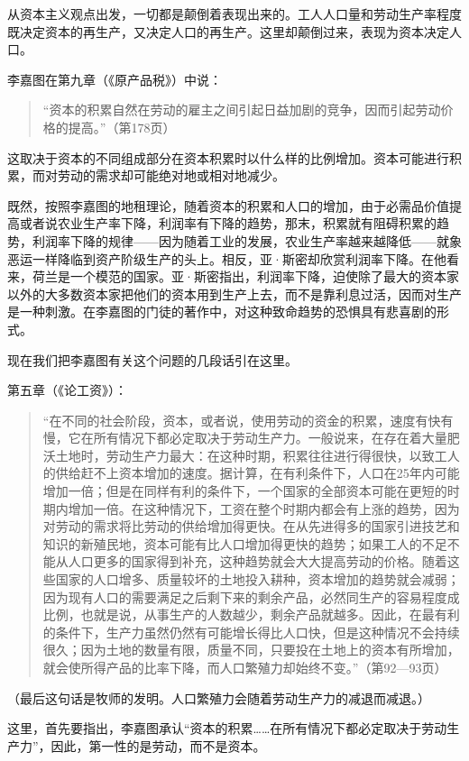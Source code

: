 从资本主义观点出发，一切都是颠倒着表现出来的。工人人口量和劳动生产率程度既决定资本的再生产，又决定人口的再生产。这里却颠倒过来，表现为资本决定人口。

李嘉图在第九章（《原产品税》）中说：

\begin{quote}{“资本的积累自然在劳动的雇主之间引起日益加剧的竞争，因而引起劳动价格的提高。”（第178页）}\end{quote}

这取决于资本的不同组成部分在资本积累时以什么样的比例增加。资本可能进行积累，而对劳动的需求却可能绝对地或相对地减少。

既然，按照李嘉图的地租理论，随着资本的积累和人口的增加，由于必需品价值提高或者说农业生产率下降，利润率有下降的趋势，那末，积累就有阻碍积累的趋势，利润率下降的规律——因为随着工业的发展，农业生产率越来越降低——就象恶运一样降临到资产阶级生产的头上。相反，亚·斯密却欣赏利润率下降。在他看来，荷兰是一个模范的国家。亚·斯密指出，利润率下降，迫使除了最大的资本家以外的大多数资本家把他们的资本用到生产上去，而不是靠利息过活，因而对生产是一种刺激。在李嘉图的门徒的著作中，对这种致命趋势的恐惧具有悲喜剧的形式。

现在我们把李嘉图有关这个问题的几段话引在这里。

第五章（《论工资》）：

\begin{quote}{“在不同的社会阶段，资本，或者说，使用劳动的资金的积累，速度有快有慢，它在所有情况下都必定取决于劳动生产力。一般说来，在存在着大量肥沃土地时，劳动生产力最大：在这种时期，积累往往进行得很快，以致工人的供给赶不上资本增加的速度。据计算，在有利条件下，人口在25年内可能增加一倍；但是在同样有利的条件下，一个国家的全部资本可能在更短的时期内增加一倍。在这种情况下，工资在整个时期内都会有上涨的趋势，因为对劳动的需求将比劳动的供给增加得更快。在从先进得多的国家引进技艺和知识的新殖民地，资本可能有比人口增加得更快的趋势；如果工人的不足不能从人口更多的国家得到补充，这种趋势就会大大提高劳动的价格。随着这些国家的人口增多、质量较坏的土地投入耕种，资本增加的趋势就会减弱；因为现有人口的需要满足之后剩下来的剩余产品，必然同生产的容易程度成比例，也就是说，从事生产的人数越少，剩余产品就越多。因此，在最有利的条件下，生产力虽然仍然有可能增长得比人口快，但是这种情况不会持续很久；因为土地的数量有限，质量不同，只要投在土地上的资本有所增加，就会使所得产品的比率下降，而人口繁殖力却始终不变。”（第92—93页）}\end{quote}

（最后这句话是牧师的发明。人口繁殖力会随着劳动生产力的减退而减退。）

这里，首先要指出，李嘉图承认“资本的积累……在所有情况下都必定取决于劳动生产力”，因此，第一性的是劳动，而不是资本。

